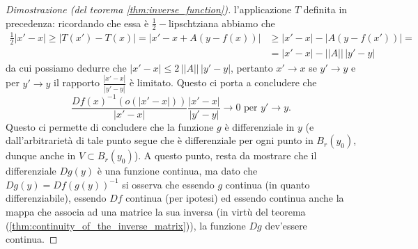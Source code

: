 \begin{proof}[Dimostrazione (del teorema \ref{thm:inverse_function})]
    l'applicazione $T$ definita in precedenza: ricordando che essa è $\frac{1}{2}-$lipschtziana abbiamo che
    \begin{align*}
    \frac{1}{2} |x' - x| \geq  |T(x') - T(x)| = |x' - x + A(y - f(x))| &\geq |x' - x| - |A(y - f(x'))| = & \\
    &=|x'-x| - || A || \, |y'-y| &
    \end{align*}
    da cui possiamo dedurre che $|x' - x| \leq 2 \, || A || \, |y' - y|$, pertanto $x' \to x$ se $y' \to y$ e per $y' \to y$ il rapporto $\frac{|x'-x|}{|y'-y|}$ è limitato. Questo ci porta a concludere che
    $$
    \frac{Df(x)^{-1}(o(|x'-x|))}{|x'-x|} \frac{|x'-x|}{|y'-y|} \to 0 \text{ per } y' \to y.
    $$
    Questo ci permette di concludere che la funzione $g$ è differenziale in $y$ (e dall'arbitrarietà di tale punto segue che è differenziale per ogni punto in $B_r(y_0)$, dunque anche in $V \subset B_r(y_0)$). A
    questo punto, resta da mostrare che il differenziale $Dg(y)$ è una funzione continua, ma dato che $Dg(y) = Df(g(y))^{-1}$ si osserva che essendo $g$ continua (in quanto differenziabile), essendo $Df$ continua (per ipotesi)
    ed essendo continua anche la mappa che associa ad una matrice la sua inversa (in virtù del teorema (\ref{thm:continuity_of_the_inverse_matrix})), la funzione $Dg$ dev'essere continua.
\end{proof}